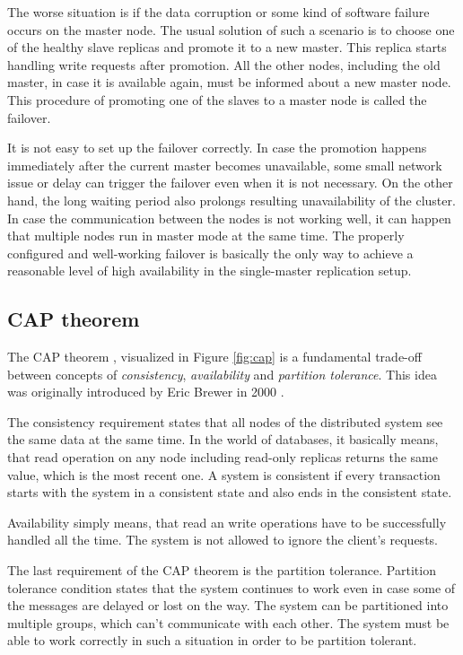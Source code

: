 \documentclass[
  digital, %
  twoside, %
  table,   %
  lof,     %
  lot,     %
]{fithesis3}
\begin{document}
The worse situation is if the data corruption or some kind of software failure occurs on the master node. The usual solution of such a scenario is to choose one of the healthy slave replicas and promote it to a new master. This replica starts handling write requests after promotion. All the other nodes, including the old master, in case it is available again, must be informed about a new master node. This procedure of promoting one of the slaves to a master node is called the failover.

It is not easy to set up the failover correctly. In case the promotion happens immediately after the current master becomes unavailable, some small network issue or delay can trigger the failover even when it is not necessary. On the other hand, the long waiting period also prolongs resulting unavailability of the cluster. In case the communication between the nodes is not working well, it can happen that multiple nodes run in master mode at the same time. The properly configured and well-working failover is basically the only way to achieve a reasonable level of high availability in the single-master replication setup.

\subsection{CAP theorem}
The CAP theorem \cite{cap}, visualized in Figure \ref{fig:cap} is a fundamental trade-off between concepts of \textit{consistency}, \textit{availability} and \textit{partition tolerance}. This idea was originally introduced by Eric Brewer in 2000 \cite{brewer_cap}.

The consistency requirement states that all nodes of the distributed system see the same data at the same time. In the world of databases, it basically means, that read operation on any node including read-only replicas returns the same value, which is the most recent one. A system is consistent if every transaction starts with the system in a consistent state and also ends in the consistent state.

Availability simply means, that read an write operations have to be successfully handled all the time. The system is not allowed to ignore the client's requests.

The last requirement of the CAP theorem is the partition tolerance. Partition tolerance condition states that the system continues to work even in case some of the messages are delayed or lost on the way. The system can be partitioned into multiple groups, which can't communicate with each other. The system must be able to work correctly in such a situation in order to be partition tolerant.
\end{document}
